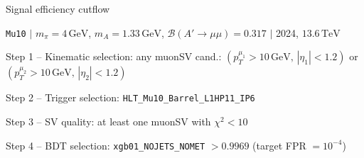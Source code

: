 \documentclass[10pt,a4paper]{article}
\begin{document}
{\large Signal efficiency cutflow

 \texttt{Mu10} $|$ $m_{\pi}=4\,\mathrm{GeV}$, $m_{A}=1.33\,\mathrm{GeV}$, $\mathcal{B}(A'\!\to\!\mu\mu)=0.317$ $|$ 2024, $13.6\,\mathrm{TeV}$}

\vspace{0.8em}

Step 1 -- Kinematic selection: any muonSV cand.: $(p_T^{\mu_1}{>}10\,\mathrm{GeV},\,|\eta_1|{<}1.2)$ or $(p_T^{\mu_2}{>}10\,\mathrm{GeV},\,|\eta_2|{<}1.2)$

Step 2 -- Trigger selection: \texttt{HLT\_Mu10\_Barrel\_L1HP11\_IP6}

Step 3 -- SV quality: at least one muonSV with $\chi^2<10$

Step 4 -- BDT selection: \texttt{xgb01\_NOJETS\_NOMET} $>0.9969$ (target FPR $=10^{-4}$)

\vspace{0.8em}
\end{document}

